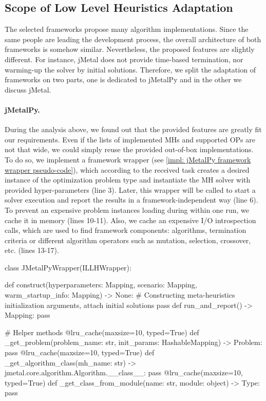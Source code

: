 \subsection{Scope of Low Level Heuristics Adaptation}\label{impl: LLH scope}
The selected frameworks propose many algorithm implementations. Since the same people are leading the development process, the overall architecture of both frameworks is somehow similar. Nevertheless, the proposed features are slightly different. For instance, jMetal does not provide time-based termination, nor warming-up the solver by initial solutions. Therefore, we split the adaptation  of frameworks on two parts, one is dedicated to jMetalPy and in the other we discuss jMetal.

\paragraph{jMetalPy.} During the analysis above, we found out that the provided features are greatly fit our requirements. Even if the lists of implemented MHs and supported OPs are not that wide, we could simply reuse the provided out-of-box implementations. To do so, we implement a framework wrapper (see \cref{impl: jMetalPy framework wrapper pseudo-code}), which according to the received task creates a desired instance of the optimization problem type and instantiate the MH solver with provided hyper-parameters (line 3). Later, this wrapper will be called to start a solver execution and report the results in a framework-independent way (line 6). To prevent an expensive problem instances loading during within one run, we cache it in memory (lines 10-11). Also, we cache an expensive I/O introspection calls, which are used to find framework components: algorithms, termination criteria or different algorithm operators such as mutation, selection, crossover, etc. (lines 13-17).

\begin{code}[language=Python, caption=jMetalPy framework wrapper pseudo-code., label=impl: jMetalPy framework wrapper pseudo-code]
class JMetalPyWrapper(ILLHWrapper):

	def construct(hyperparameters: Mapping, scenario: Mapping, warm_startup_info: Mapping) -> None:
		# Constructing meta-heuristics initialization arguments, attach initial solutions
		pass
	def run_and_report() -> Mapping:
		pass

	# Helper methods
	@lru_cache(maxsize=10, typed=True)
	def _get_problem(problem_name: str, init_params: HashableMapping) -> Problem:
		pass
	@lru_cache(maxsize=10, typed=True)
	def _get_algorithm_class(mh_name: str) -> jmetal.core.algorithm.Algorithm.__class__:
		pass
	@lru_cache(maxsize=10, typed=True)
	def _get_class_from_module(name: str, module: object) -> Type:
		pass
\end{code}

